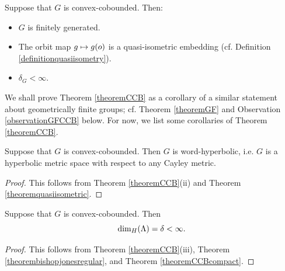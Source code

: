 \begin{theorem}
\label{theoremCCB}
Suppose that $G$ is convex-cobounded. Then:
\begin{itemize}
\item[(i)] $G$ is finitely generated.
\item[(ii)] The orbit map $g\mapsto g(o)$ is a quasi-isometric embedding (cf. Definition \ref{definitionquasiisometry}).
\item[(iii)] %
$\delta_G < \infty$.
\end{itemize}
\end{theorem}
We shall prove Theorem \ref{theoremCCB} as a corollary of a similar statement about geometrically finite groups; cf. Theorem \ref{theoremGF} and Observation \ref{observationGFCCB} below. For now, we list some corollaries of Theorem \ref{theoremCCB}.

\begin{corollary}
Suppose that $G$ is convex-cobounded. Then $G$ is word-hyperbolic, i.e. $G$ is a hyperbolic metric space with respect to any Cayley metric.
\end{corollary}
\begin{proof}
This follows from Theorem \ref{theoremCCB}(ii) and Theorem \ref{theoremquasiisometric}.
\end{proof}


\begin{corollary}
Suppose that $G$ is convex-cobounded. Then 
\[
{\dim_H}(\Lambda) = \delta < \infty.
\]
\end{corollary}
\begin{proof}
This follows from Theorem \ref{theoremCCB}(iii), Theorem \ref{theorembishopjonesregular}, and Theorem \ref{theoremCCBcompact}.
\end{proof}



%
%
%
%
%

